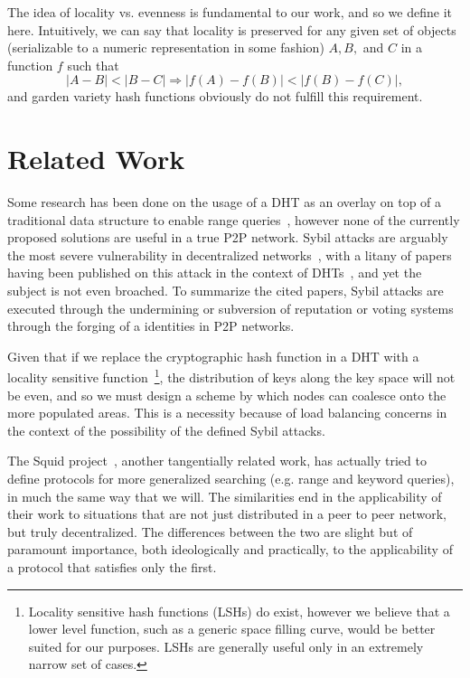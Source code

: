 \documentclass[10pt]{IEEEtran}
\begin{document}
The idea of locality vs. evenness is fundamental to our work, and so we define it here. Intuitively, we can say that locality is preserved for any given set of objects (serializable to a numeric representation in some fashion) $A,B,$ and $C$ in a function $f$ such that
\begin{equation} \label{eq:locality}
|A-B| < |B-C| \Rightarrow |f(A)-f(B)| < |f(B) - f(C)|,
\end{equation}
and garden variety hash functions obviously do not fulfill this requirement.

\section{Related Work}
\par Some research has been done on the usage of a DHT as an overlay on top of a traditional data structure to enable range queries~\cite{Ramabhadran:2004tr,Desnoyers:2008uo}, however none of the currently proposed solutions are useful in a true P2P network. Sybil attacks are arguably the most severe vulnerability in decentralized networks~\cite{Douceur:2002jr}, with a litany of papers having been published on this attack in the context of DHTs~\cite{LesniewskiLass:2010ue}, and yet the subject is not even broached. To summarize the cited papers, Sybil attacks are executed through the undermining or subversion of reputation or voting systems through the forging of a identities in P2P networks.

\par Given that if we replace the cryptographic hash function in a DHT with a locality sensitive function~\footnote{Locality sensitive hash functions (LSHs) do exist, however we believe that a lower level function, such as a generic space filling curve, would be better suited for our purposes. LSHs are generally useful only in an extremely narrow set of cases.}, the distribution of keys along the key space will not be even, and so we must design a scheme by which nodes can coalesce onto the more populated areas. This is a necessity because of load balancing concerns in the context of the possibility of the defined Sybil attacks.

\par The Squid project~\cite{Schmidt:2003cd}, another tangentially related work, has actually tried to define protocols for more generalized searching (e.g. range and keyword queries), in much the same way that we will. The similarities end in the applicability of their work to situations that are not just distributed in a peer to peer network, but truly decentralized. The differences between the two are slight but of paramount importance, both ideologically and practically, to the applicability of a protocol that satisfies only the first.
\end{document}
